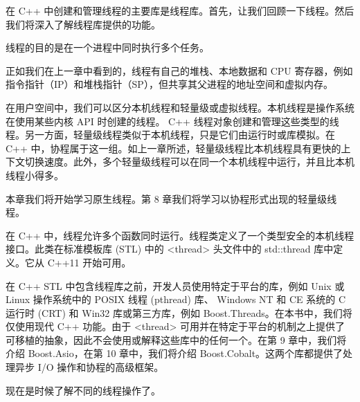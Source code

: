 
在 C++ 中创建和管理线程的主要库是线程库。首先，让我们回顾一下线程。然后我们将深入了解线程库提供的功能。


线程的目的是在一个进程中同时执行多个任务。

正如我们在上一章中看到的，线程有自己的堆栈、本地数据和 CPU 寄存器，例如指令指针（IP）和堆栈指针（SP），但共享其父进程的地址空间和虚拟内存。

在用户空间中，我们可以区分本机线程和轻量级或虚拟线程。本机线程是操作系统在使用某些内核 API 时创建的线程。 C++ 线程对象创建和管理这些类型的线程。另一方面，轻量级线程类似于本机线程，只是它们由运行时或库模拟。在 C++ 中，协程属于这一组。如上一章所述，轻量级线程比本机线程具有更快的上下文切换速度。此外，多个轻量级线程可以在同一个本机线程中运行，并且比本机线程小得多。

本章我们将开始学习原生线程。第 8 章我们将学习以协程形式出现的轻量级线程。


在 C++ 中，线程允许多个函数同时运行。线程类定义了一个类型安全的本机线程接口。此类在标准模板库 (STL) 中的 <thread> 头文件中的 std::thread 库中定义。它从 C++11 开始可用。

在 C++ STL 中包含线程库之前，开发人员使用特定于平台的库，例如 Unix 或 Linux 操作系统中的 POSIX 线程 (pthread) 库、 Windows NT 和 CE 系统的 C 运行时 (CRT) 和 Win32 库或第三方库，例如 Boost.Threads。在本书中，我们将仅使用现代 C++ 功能。由于 <thread> 可用并在特定于平台的机制之上提供了可移植的抽象，因此不会使用或解释这些库中的任何一个。在第 9 章中，我们将介绍 Boost.Asio，在第 10 章中，我们将介绍 Boost.Cobalt。这两个库都提供了处理异步 I/O 操作和协程的高级框架。

现在是时候了解不同的线程操作了。
